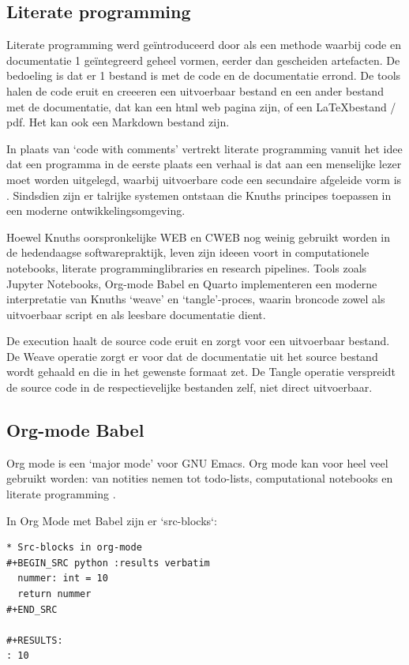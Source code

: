 \subsection{Literate programming}
Literate programming \autocite{LiterateProgramming} werd geïntroduceerd door \textcite{Knuth1984} als een methode waarbij code en documentatie 1 geïntegreerd geheel vormen, eerder dan gescheiden artefacten. De bedoeling is dat er 1 bestand is met de code en de documentatie errond. De tools halen de code eruit en creeeren een uitvoerbaar bestand en een ander bestand met de documentatie, dat kan een html web pagina zijn, of een \LaTeX \@ bestand / pdf. Het kan ook een Markdown bestand zijn.

In plaats van `code with comments' vertrekt literate programming vanuit het idee dat een programma in de eerste plaats een verhaal is dat aan een menselijke lezer moet worden uitgelegd, waarbij uitvoerbare code een secundaire afgeleide vorm is \autocite{Knuth1984}.
Sindsdien zijn er talrijke systemen ontstaan die Knuths principes toepassen in een moderne ontwikkelingsomgeving.

Hoewel Knuths oorspronkelijke WEB en CWEB nog weinig gebruikt worden in de hedendaagse softwarepraktijk, leven zijn ideeen voort in computationele notebooks, literate programminglibraries en research pipelines. Tools zoals Jupyter Notebooks, Org-mode Babel en Quarto implementeren een moderne interpretatie van Knuths `weave' en `tangle'-proces, waarin broncode zowel als uitvoerbaar script en als leesbare documentatie dient.

De execution haalt de source code eruit en zorgt voor een uitvoerbaar bestand. De Weave operatie zorgt er voor dat de documentatie uit het source bestand wordt gehaald en die in het gewenste formaat zet. De Tangle operatie verspreidt de source code in de respectievelijke bestanden zelf, niet direct uitvoerbaar.

\subsection{Org-mode Babel}
Org mode is een `major mode' voor GNU Emacs. Org mode kan voor heel veel gebruikt worden: van notities nemen tot todo-lists, computational notebooks en literate programming \autocite{orgmode2025}.

In Org Mode met Babel zijn er `src-blocks`:

\begin{verbatim}
* Src-blocks in org-mode
#+BEGIN_SRC python :results verbatim
  nummer: int = 10
  return nummer
#+END_SRC

#+RESULTS:
: 10
\end{verbatim}


